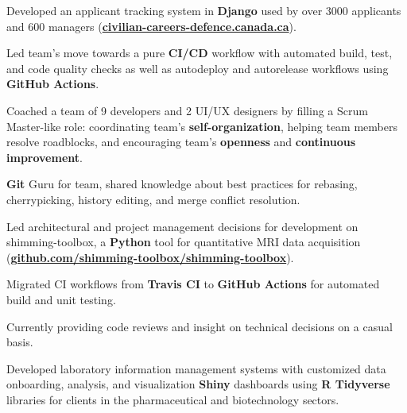 \documentclass[]{jidicula-resume}
\begin{document}
\vspace{\topsep} %
\begin{tightemize}
\item Developed an applicant tracking system in \textbf{Django} used by over 3000 applicants and 600 managers (\href{https://civilian-careers-defence.canada.ca}{\bf civilian-careers-defence.canada.ca}).
\item Led team's move towards a pure \textbf{CI/CD} workflow with automated build, test, and code quality checks as well as autodeploy and autorelease workflows using \textbf{GitHub Actions}.
\item Coached a team of 9 developers and 2 UI/UX designers by filling a Scrum Master-like role: coordinating team's \textbf{self-organization}, helping team members resolve roadblocks, and encouraging team's \textbf{openness} and \textbf{continuous improvement}.
\item \textbf{Git} Guru for team, shared knowledge about best practices for rebasing, cherrypicking, history editing, and merge conflict resolution.
\end{tightemize}
\sectionsep{}

\vspace{\topsep} %
\begin{tightemize}
\item Led architectural and project management decisions for development on shimming-toolbox, a \textbf{Python} tool for quantitative MRI data acquisition (\href{https://github.com/shimming-toolbox/shimming-toolbox}{\bf github.com/shimming-toolbox/shimming-toolbox}).
\item Migrated CI workflows from \textbf{Travis CI} to \textbf{GitHub Actions} for automated build and unit testing.
\item Currently providing code reviews and insight on technical decisions on a casual basis.
\end{tightemize}
\sectionsep{}

\vspace{\topsep} %
\begin{tightemize}
\item Developed laboratory information management systems with customized data
  onboarding, analysis, and visualization \textbf{Shiny} dashboards using \textbf{R Tidyverse} libraries
  for clients in the pharmaceutical and biotechnology sectors.
\end{tightemize}
\sectionsep{}
\end{document}

